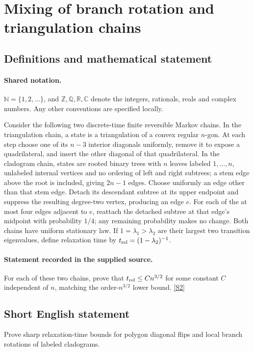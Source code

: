 \documentclass[11pt]{article}
\newcommand{\sref}[2]{\hyperlink{source:#1:#2}{[S#2]}}
\begin{document}
\section{Mixing of branch rotation and triangulation chains}\label{statement}

\subsection{Definitions and mathematical statement}

\paragraph{Shared notation.}$\mathbb N=\{1,2,\ldots\}$, and $\mathbb Z,\mathbb Q,\mathbb R,\mathbb C$ denote the integers, rationals, reals and complex numbers. Any other conventions are specified locally.


Consider the following two discrete-time finite reversible Markov chains. In the triangulation chain, a state is a triangulation of a convex regular $n$-gon. At each step choose one of its $n-3$ interior diagonals uniformly, remove it to expose a quadrilateral, and insert the other diagonal of that quadrilateral.
In the cladogram chain, states are rooted binary trees with $n$ leaves labeled $1,\ldots,n$, unlabeled internal vertices and no ordering of left and right subtrees; a stem edge above the root is included, giving $2n-1$ edges. Choose uniformly an edge other than that stem edge. Detach its descendant subtree at its upper endpoint and suppress the resulting degree-two vertex, producing an edge $e$. For each of the at most four edges adjacent to $e$, reattach the detached subtree at that edge's midpoint with probability $1/4$; any remaining probability makes no change. Both chains have uniform stationary law. If $1=\lambda_1>\lambda_2$ are their largest two transition eigenvalues, define relaxation time by $t_{\rm rel}=(1-\lambda_2)^{-1}$.
\paragraph{Statement recorded in the supplied source.}
For each of these two chains, prove that $t_{\rm rel}\le Cn^{3/2}$ for some constant $C$ independent of $n$, matching the order-$n^{3/2}$ lower bound. \sref{statement}{2}
\subsection{Short English statement}
Prove sharp relaxation-time bounds for polygon diagonal flips and local branch rotations of labeled cladograms.
\end{document}
